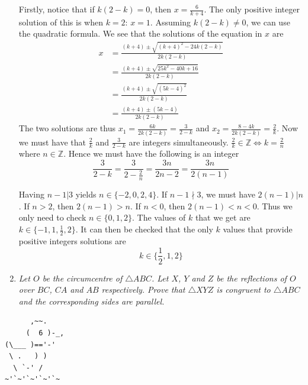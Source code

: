 \documentclass{article}
\begin{document}
\begin{enumerate}[1.]
Firstly, notice that if $k(2 - k) = 0$, then $x = \frac{6}{k + 4}$. The only positive integer solution of this is when $k = 2$: $x = 1$.
Assuming $k(2 - k) \ne 0$, we can use the quadratic formula. We see that the solutions of the equation in $x$ are
\begin{align*}
    x &= \frac{(k + 4) \pm \sqrt{(k + 4)^2 - 24k(2 - k)}}{2k(2 - k)} \\
    &= \frac{(k + 4) \pm \sqrt{25k^2 - 40k + 16}}{2k(2 - k)} \\
    &= \frac{(k + 4) \pm \sqrt{(5k - 4)^2}}{2k(2 - k)} \\
    &= \frac{(k + 4) \pm (5k - 4)}{2k(2 - k)}
\end{align*}
The two solutions are thus $x_1 = \frac{6k}{2k(2 - k)} = \frac{3}{2 - k}$ and $x_2 = \frac{8 - 4k}{2k(2 - k)} = \frac{2}{k}$. Now we must have that $\frac{2}{k}$ and $\frac{3}{2 - k}$ are integers simultaneously. $\frac{2}{k} \in \mathbb{Z} \iff k = \frac{2}{n}$ where $n \in \mathbb{Z}$. Hence we must have the following is an integer 
$$\frac{3}{2 - k} = \frac{3}{2 - \frac{2}{n}} = \frac{3n}{2n - 2}= \frac{3n}{2(n - 1)}$$

Having $n - 1 | 3$ yields $n \in \{-2, 0, 2, 4\}$. If $n - 1 \nmid 3$, we must have $2(n - 1) | n$. If $n > 2$, then $2(n - 1) > n$. If $n < 0$, then $2(n - 1) < n < 0$. Thus we only need to check $n \in \{0, 1, 2\}$. The values of $k$ that we get are $k \in \{-1, 1, \frac{1}{2}, 2\}$. It can then be checked that the only $k$ values that provide positive integers solutions are 
$$k \in \{\frac{1}{2}, 1, 2\}$$

\item %
{\itshape Let $O$ be the circumcentre of $\triangle ABC$. Let $X$, $Y$ and $Z$ be the reflections of $O$ over $BC$, $CA$ and $AB$ respectively. Prove that $\triangle XYZ$ is congruent to $\triangle ABC$ and the corresponding sides are parallel.}


\end{enumerate}


\vfill
\centering
\begin{BVerbatim}
      ,~~.
     (  6 )-_,
(\___ )=='-'
 \ .   ) )
  \ `-' /    
~'`~'`~'`~'`~
\end{BVerbatim}
\end{document}
